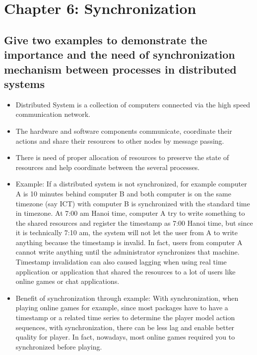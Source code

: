 \documentclass[11pt,a4paper]{report}
\begin{document}
	\chapter{Chapter 6: Synchronization}
	\newpage
	\section{Give two examples to demonstrate the importance and the need of synchronization mechanism between processes in distributed systems}
\begin{itemize}
	\item Distributed System is a collection of computers connected via the high speed communication network.
	\item The hardware and software components communicate, coordinate their actions and share their resources to other nodes by message passing.
	\item There is need of proper allocation of resources to preserve the state of resources and help coordinate between the several processes.
	\item Example: If a distributed system is not synchronized, for example computer A is 10 minutes behind computer B and both computer is on the same timezone (say ICT) with computer B is synchronized with the standard time in timezone. At 7:00 am Hanoi time, computer A try to write something to the shared resources and register the timestamp as 7:00 Hanoi time, but since it is technically 7:10 am, the system will not let the user from A to write anything because the timestamp is invalid. In fact, users from computer A cannot write anything until the administrator synchronizes that machine. Timestamp invalidation can also caused lagging when using real time application or application that shared the resources to a lot of users like online games or chat applications.
	\item Benefit of synchronization through example: With synchronization, when playing online games for example, since most packages have to have a timestamp or a related time series to determine the player model action sequences, with synchronization, there can be less lag and enable better quality for player. In fact, nowadays, most online games required you to synchronized before playing. 
\end{itemize}
\end{document}
